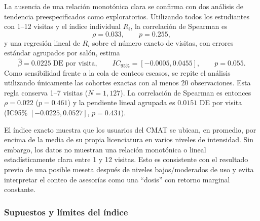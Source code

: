 La ausencia de una relación monotónica clara se confirma con dos análisis de tendencia preespecificados como exploratorios. Utilizando todos los estudiantes con 1--12 visitas y el índice individual $R_i$, la correlación de Spearman es
\[
\rho=0.033,\qquad p=0.255,
\]
y una regresión lineal de $R_i$ sobre el número exacto de visitas, con errores estándar agrupados por salón, estima
\[
\widehat\beta=0.0225\;\text{DE por visita},
\qquad IC_{95\%}=[-0.0005,0.0455],
\qquad p=0.055.
\]
Como sensibilidad frente a la cola de conteos escasos, se repite el análisis utilizando únicamente las cohortes exactas con al menos 20 observaciones. Esta regla conserva 1--7 visitas ($N=1{,}127$). La correlación de Spearman es entonces $\rho=0.022$ ($p=0.461$) y la pendiente lineal agrupada es $0.0151$ DE por visita (IC95\% $[-0.0225,0.0527]$, $p=0.431$).

\begin{answerbox}
El índice exacto muestra que los usuarios del CMAT se ubican, en promedio, por encima de la media de su propia licenciatura en varios niveles de intensidad. Sin embargo, los datos no muestran una relación monotónica o lineal estadísticamente clara entre 1 y 12 visitas. Esto es consistente con el resultado previo de una posible meseta después de niveles bajos/moderados de uso y evita interpretar el conteo de asesorías como una ``dosis'' con retorno marginal constante.
\end{answerbox}

\subsubsection{Supuestos y límites del índice}


